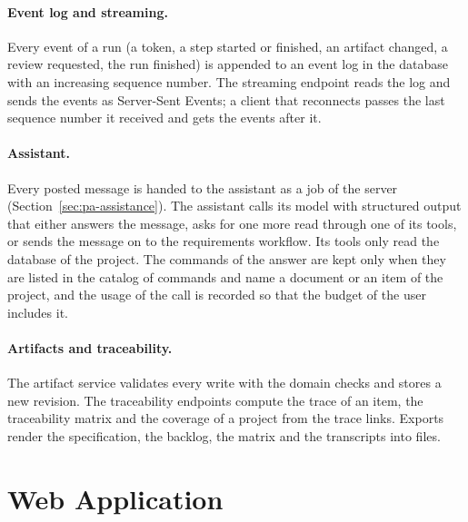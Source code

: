 \paragraph{Event log and streaming.} Every event of a run (a token, a step started or finished, an artifact changed, a review requested, the run finished) is appended to an event log in the database with an increasing sequence number. The streaming endpoint reads the log and sends the events as Server-Sent Events; a client that reconnects passes the last sequence number it received and gets the events after it.

\paragraph{Assistant.} Every posted message is handed to the assistant as a job of the server (Section~\ref{sec:pa-assistance}). The assistant calls its model with structured output that either answers the message, asks for one more read through one of its tools, or sends the message on to the requirements workflow. Its tools only read the database of the project. The commands of the answer are kept only when they are listed in the catalog of commands and name a document or an item of the project, and the usage of the call is recorded so that the budget of the user includes it.

\paragraph{Artifacts and traceability.} The artifact service validates every write with the domain checks and stores a new revision. The traceability endpoints compute the trace of an item, the traceability matrix and the coverage of a project from the trace links. Exports render the specification, the backlog, the matrix and the transcripts into files.

\section{Web Application}
\label{sec:impl-frontend}

